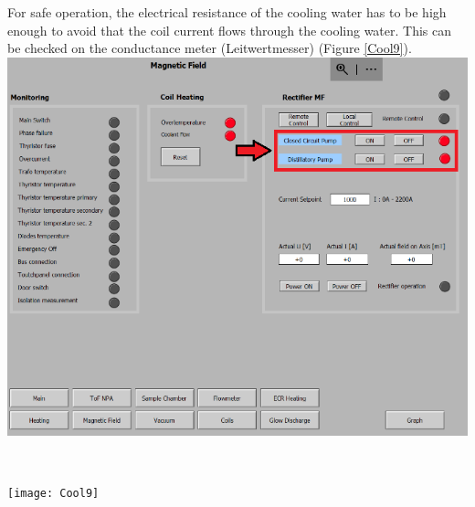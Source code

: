 \documentclass[fleqn,a4paper,20pt]{article}
\begin{document}
\newpage
\begin{minipage}{.58\textwidth}
For safe operation, the electrical resistance of the cooling water has to be high enough to avoid that the coil current flows through the cooling water. This can be checked on the conductance meter (Leitwertmesser) (Figure \ref{Cool9}).\\



	\includegraphics[width=\linewidth]{Cool10}
	\label{Cool10}
\end{minipage}
\begin{minipage}{.02\textwidth}
	$\ $\\
\end{minipage}
\begin{minipage}{.4\textwidth}


	\texttt{[image: Cool9]}
	\captionsetup{width=0.75\textwidth}
	\label{Cool9}
\end{minipage}
\vspace*{0.5cm}
\end{document}
